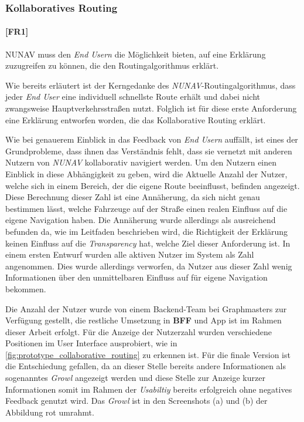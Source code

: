\subsubsection{Kollaboratives Routing}
\label{sec:user_count_definition}

\paragraph{[FR1]} NUNAV muss den \textit{End Usern} die Möglichkeit bieten, auf eine Erklärung zuzugreifen zu können, die den Routingalgorithmus erklärt.

Wie bereits erläutert ist der Kerngedanke des \textit{NUNAV}-Routingalgorithmus, dass jeder \textit{End User} eine individuell schnellste Route erhält und dabei nicht zwangsweise Hauptverkehrsstraßen nutzt. Folglich ist für diese erste Anforderung eine Erklärung entworfen worden, die das Kollaborative Routing erklärt.

Wie bei genauerem Einblick in das Feedback von \textit{End Usern} auffällt, ist eines der Grundprobleme, dass ihnen das Verständnis fehlt, dass sie vernetzt mit anderen Nutzern von \textit{NUNAV} kollaborativ navigiert werden. Um den Nutzern einen Einblick in diese Abhängigkeit zu geben, wird die Aktuelle Anzahl der Nutzer, welche sich in einem Bereich, der die eigene Route beeinflusst, befinden angezeigt. Diese Berechnung dieser Zahl ist eine Annäherung, da sich nicht genau bestimmen lässt, welche Fahrzeuge auf der Straße einen realen Einfluss auf die eigene Navigation haben. Die Annäherung wurde allerdings als ausreichend befunden da, wie im Leitfaden beschrieben wird, die Richtigkeit der Erklärung keinen Einfluss auf die \textit{Transparency} hat, welche Ziel dieser Anforderung ist. In einem ersten Entwurf wurden alle aktiven Nutzer im System als Zahl angenommen. Dies wurde allerdings verworfen, da Nutzer aus dieser Zahl wenig Informationen über den unmittelbaren Einfluss auf für eigene Navigation bekommen.

Die Anzahl der Nutzer wurde von einem Backend-Team bei Graphmasters zur Verfügung gestellt, die restliche Umsetzung in \textbf{BFF} und App ist im Rahmen dieser Arbeit erfolgt. Für die Anzeige der Nutzerzahl wurden verschiedene Positionen im User Interface ausprobiert, wie in \autoref{fig:prototype_collaborative_routing} zu erkennen ist. Für die finale Version ist die Entschiedung gefallen, da an dieser Stelle bereits andere Informationen als sogenanntes \textit{Growl} angezeigt werden und diese Stelle zur Anzeige kurzer Informationen somit im Rahmen der \textit{Usabiltiy} bereits erfolgreich ohne negatives Feedback genutzt wird. Das \textit{Growl} ist in den Screenshots (a) und (b) der Abbildung rot umrahmt.

